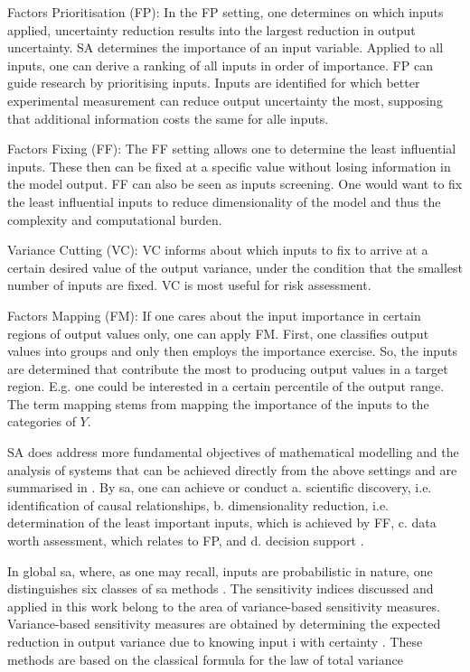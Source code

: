 Factors Prioritisation (FP): In the FP setting, one determines on which inputs applied, uncertainty reduction results into the largest reduction in output uncertainty. SA determines the importance of an input variable. Applied to all inputs, one can derive a ranking of all inputs in order of importance. FP can guide research by prioritising inputs. Inputs are identified for which better experimental measurement can reduce output uncertainty the most, supposing that additional information costs the same for alle inputs.

Factors Fixing (FF): The FF setting allows one to determine the least influential inputs. These then can be fixed at a specific value without losing information in the model output. FF can also be seen as inputs screening. One would want to fix the least influential inputs to reduce dimensionality of the model and thus the complexity and computational burden.

Variance Cutting (VC): VC informs about which inputs to fix to arrive at a certain desired value of the output variance, under the condition that the smallest number of inputs are fixed. VC is most useful for risk assessment.

Factors Mapping (FM): If one cares about the input importance in certain regions of output values only, one can apply FM. First, one classifies output values into groups and only then employs the importance exercise. So, the inputs are determined that contribute the most to producing output values in a target region. E.g. one could be interested in a certain percentile of the output range. The term mapping stems from mapping the importance of the inputs to the categories of $Y$.

SA does address more fundamental objectives of mathematical modelling and the analysis of systems that can be achieved directly from the above settings and are summarised in \citet{R21}. By sa, one can achieve or conduct a. scientific discovery, i.e. identification of causal relationships, b. dimensionality reduction, i.e. determination of the least important inputs, which is achieved by FF, c. data worth assessment, which relates to FP, and d. decision support \citep{R21}.

In global sa, where, as one may recall, inputs are probabilistic in nature, one distinguishes six classes of sa methods \citep{BP16}. The sensitivity indices discussed and applied in this work belong to the area of variance-based sensitivity measures. Variance-based sensitivity measures are obtained by determining the expected reduction in output variance due to knowing input i with certainty \citep{BP16}. These methods are based on the classical formula for the law of total variance

